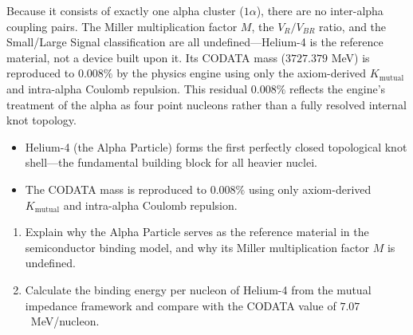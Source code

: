 Because it consists of exactly one alpha cluster ($1\alpha$), there are no inter-alpha coupling pairs. The Miller multiplication factor $M$, the $V_R/V_{BR}$ ratio, and the Small/Large Signal classification are all undefined---Helium-4 is the reference material, not a device built upon it. Its CODATA mass ($3727.379$ MeV) is reproduced to $0.008\%$ by the physics engine using only the axiom-derived $K_{\text{mutual}}$ and intra-alpha Coulomb repulsion. This residual $0.008\%$ reflects the engine's treatment of the alpha as four point nucleons rather than a fully resolved internal knot topology.

\begin{summarybox}
\begin{itemize}
    \item Helium-4 (the Alpha Particle) forms the first perfectly closed topological knot shell---the fundamental building block for all heavier nuclei.
    \item The CODATA mass is reproduced to $0.008\%$ using only axiom-derived $K_{\text{mutual}}$ and intra-alpha Coulomb repulsion.
\end{itemize}
\end{summarybox}

\begin{exercisebox}
\begin{enumerate}
    \item Explain why the Alpha Particle serves as the reference material in the semiconductor binding model, and why its Miller multiplication factor $M$ is undefined.
    \item Calculate the binding energy per nucleon of Helium-4 from the mutual impedance framework and compare with the CODATA value of $7.07$~MeV/nucleon.
\end{enumerate}
\end{exercisebox}

